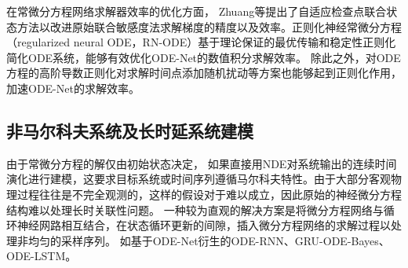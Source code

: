 在常微分方程网络求解器效率的优化方面，
Zhuang等\cite{Zhuang2020}提出了自适应检查点联合状态方法以改进原始联合敏感度法求解梯度的精度以及效率。正则化神经常微分方程（regularized neural ODE，RN-ODE）\cite{J2020}基于理论保证的最优传输和稳定性正则化简化ODE系统，能够有效优化ODE-Net的数值积分求解效率。
除此之外，对ODE方程的高阶导数正则化\cite{kelly2020}对求解时间点添加随机扰动\cite{Ghosh2020}等方案也能够起到正则化作用，加速ODE-Net的求解效率。






\subsection{非马尔科夫系统及长时延系统建模}
由于常微分方程的解仅由初始状态决定，
如果直接用NDE对系统输出的连续时间演化进行建模，这要求目标系统或时间序列遵循马尔科夫特性。由于大部分客观物理过程往往是不完全观测的，这样的假设对于难以成立，因此原始的神经微分方程结构难以处理长时关联性问题。
一种较为直观的解决方案是将微分方程网络与循环神经网路相互结合，在状态循环更新的间隙，插入微分方程网络的求解过程以处理非均匀的采样序列。
如基于ODE-Net衍生的ODE-RNN\cite{10.5555/3454287.3454765}、GRU-ODE-Bayes\cite{brouwer2019gru}、ODE-LSTM\cite{lechner2020learning}。

